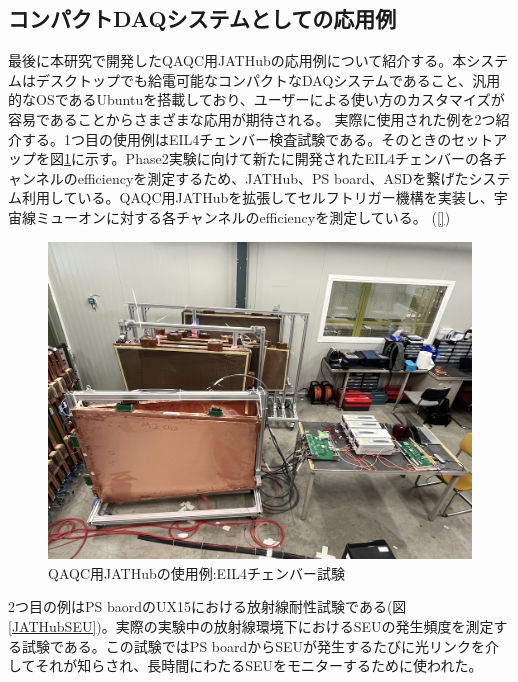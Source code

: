\subsection{コンパクトDAQシステムとしての応用例}
\label{subsec_compactdaq}
最後に本研究で開発したQAQC用JATHubの応用例について紹介する。本システムはデスクトップでも給電可能なコンパクトなDAQシステムであること、汎用的なOSであるUbuntuを搭載しており、ユーザーによる使い方のカスタマイズが容易であることからさまざまな応用が期待される。
実際に使用された例を2つ紹介する。1つ目の使用例はEIL4チェンバー検査試験である。そのときのセットアップを図\ref{JATHubEIL4}に示す。Phase2実験に向けて新たに開発されたEIL4チェンバーの各チャンネルのefficiencyを測定するため、JATHub、PS board、ASDを繋げたシステム利用している。QAQC用JATHubを拡張してセルフトリガー機構を実装し、宇宙線ミューオンに対する各チャンネルのefficiencyを測定している。
\baselineskip(\ref{})

\begin{figure} 
\centering
\includegraphics[width=16cm]{fig/JATHubEIL4.JPG}
\caption[QAQC用JATHubの使用例:EIL4チェンバー試験]{QAQC用JATHubの使用例:EIL4チェンバー試験\cite{mt_wada}}
\label{JATHubEIL4}
\end{figure}

2つ目の例はPS baordのUX15における放射線耐性試験である(図\ref{JATHubSEU})。実際の実験中の放射線環境下におけるSEUの発生頻度を測定する試験である。この試験ではPS boardからSEUが発生するたびに光リンクを介してそれが知らされ、長時間にわたるSEUをモニターするために使われた。

